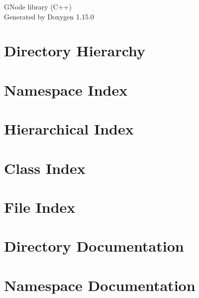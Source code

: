 \documentclass[twoside]{book}
\newcommand{\+}{\discretionary{\mbox{\scriptsize$\hookleftarrow$}}{}{}}
\newcommand{\clearemptydoublepage}{%
    \newpage{\pagestyle{empty}\cleardoublepage}%
  }
\begin{document}
  \raggedbottom
    \hypersetup{pageanchor=false,
                bookmarksnumbered=true,
                pdfencoding=unicode
               }
  \begin{titlepage}
  \vspace*{7cm}
  \begin{center}%
  {\Large GNode library (\+C++)}\\
  \vspace*{1cm}
  {\large Generated by Doxygen 1.15.0}\\
  \end{center}
  \end{titlepage}
  \clearemptydoublepage
  \tableofcontents
  \clearemptydoublepage
  \hypersetup{pageanchor=true}



\chapter{Directory Hierarchy}

\chapter{Namespace Index}

\chapter{Hierarchical Index}

\chapter{Class Index}

\chapter{File Index}

\chapter{Directory Documentation}




\chapter{Namespace Documentation}

\end{document}

